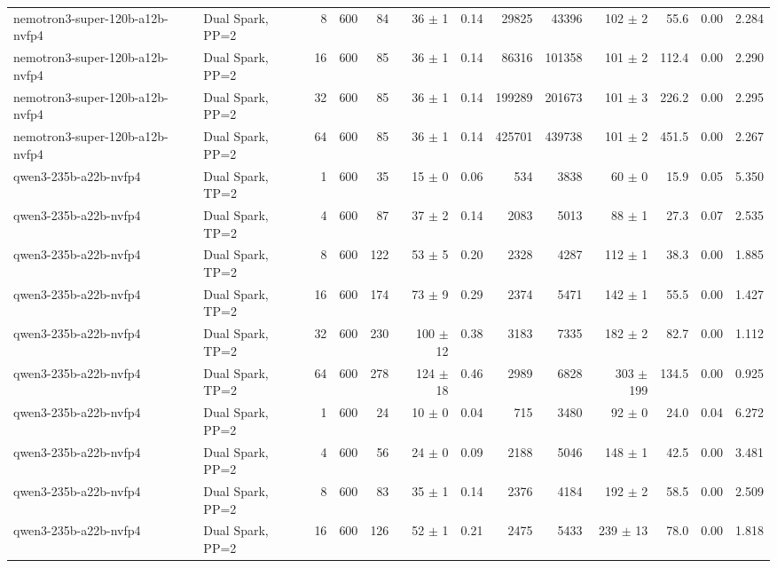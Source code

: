 \begin{tabular}{l l r r r r r r r r r r r}
nemotron3-super-120b-a12b-nvfp4 & Dual Spark, PP=2 & 8 & 600 & 84\rlap{$^\dagger$} & 36 $\pm$ 1 & 0.14 & 29825 & 43396 & 102 $\pm$ 2 & 55.6 & 0.00 & 2.284 \\
nemotron3-super-120b-a12b-nvfp4 & Dual Spark, PP=2 & 16 & 600 & 85\rlap{$^\dagger$} & 36 $\pm$ 1 & 0.14 & 86316 & 101358 & 101 $\pm$ 2 & 112.4 & 0.00 & 2.290 \\
nemotron3-super-120b-a12b-nvfp4 & Dual Spark, PP=2 & 32 & 600 & 85\rlap{$^\dagger$} & 36 $\pm$ 1 & 0.14 & 199289 & 201673 & 101 $\pm$ 3 & 226.2 & 0.00 & 2.295 \\
nemotron3-super-120b-a12b-nvfp4 & Dual Spark, PP=2 & 64 & 600 & 85\rlap{$^\dagger$} & 36 $\pm$ 1 & 0.14 & 425701 & 439738 & 101 $\pm$ 2 & 451.5 & 0.00 & 2.267 \\
\addlinespace
qwen3-235b-a22b-nvfp4 & Dual Spark, TP=2 & 1 & 600 & 35\rlap{$^\dagger$} & 15 $\pm$ 0 & 0.06 & 534 & 3838 & 60 $\pm$ 0 & 15.9 & 0.05 & 5.350 \\
qwen3-235b-a22b-nvfp4 & Dual Spark, TP=2 & 4 & 600 & 87\rlap{$^\dagger$} & 37 $\pm$ 2 & 0.14 & 2083 & 5013 & 88 $\pm$ 1 & 27.3 & 0.07 & 2.535 \\
qwen3-235b-a22b-nvfp4 & Dual Spark, TP=2 & 8 & 600 & 122 & 53 $\pm$ 5 & 0.20 & 2328 & 4287 & 112 $\pm$ 1 & 38.3 & 0.00 & 1.885 \\
qwen3-235b-a22b-nvfp4 & Dual Spark, TP=2 & 16 & 600 & 174 & 73 $\pm$ 9 & 0.29 & 2374 & 5471 & 142 $\pm$ 1 & 55.5 & 0.00 & 1.427 \\
qwen3-235b-a22b-nvfp4 & Dual Spark, TP=2 & 32 & 600 & 230 & 100 $\pm$ 12 & 0.38 & 3183 & 7335 & 182 $\pm$ 2 & 82.7 & 0.00 & 1.112 \\
qwen3-235b-a22b-nvfp4 & Dual Spark, TP=2 & 64 & 600 & 278 & 124 $\pm$ 18 & 0.46 & 2989 & 6828 & 303 $\pm$ 199 & 134.5 & 0.00 & 0.925 \\
\addlinespace
qwen3-235b-a22b-nvfp4 & Dual Spark, PP=2 & 1 & 600 & 24\rlap{$^\dagger$} & 10 $\pm$ 0 & 0.04 & 715 & 3480 & 92 $\pm$ 0 & 24.0 & 0.04 & 6.272 \\
qwen3-235b-a22b-nvfp4 & Dual Spark, PP=2 & 4 & 600 & 56\rlap{$^\dagger$} & 24 $\pm$ 0 & 0.09 & 2188 & 5046 & 148 $\pm$ 1 & 42.5 & 0.00 & 3.481 \\
qwen3-235b-a22b-nvfp4 & Dual Spark, PP=2 & 8 & 600 & 83\rlap{$^\dagger$} & 35 $\pm$ 1 & 0.14 & 2376 & 4184 & 192 $\pm$ 2 & 58.5 & 0.00 & 2.509 \\
qwen3-235b-a22b-nvfp4 & Dual Spark, PP=2 & 16 & 600 & 126 & 52 $\pm$ 1 & 0.21 & 2475 & 5433 & 239 $\pm$ 13 & 78.0 & 0.00 & 1.818 \\

\end{tabular}
